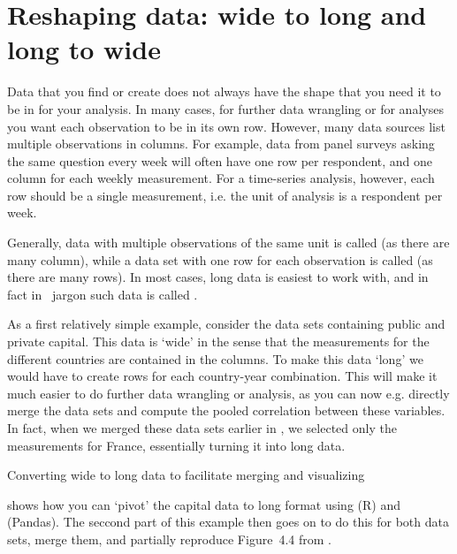 \section{Reshaping data: wide to long and long to wide}\label{sec:pivot}

Data that you find or create does not always have the shape that you need it to be in for your analysis.
In many cases, for further data wrangling or for analyses you want each observation to be in its own row.
However, many data sources list multiple observations in columns.
For example, data from panel surveys asking the same question every week will often have one row per respondent,
and one column for each weekly measurement.
For a time-series analysis, however, each row should be a single measurement,
i.e. the unit of analysis is a respondent per week.

Generally, data with multiple observations of the same unit is called  (as there are many column),
while a data set with one row for each observation is called  (as there are many rows).
In most cases, long data is easiest to work with, and in fact in \tidyverse\ jargon such data is called .

As a first relatively simple example, consider the data sets containing public and private capital.
This data is `wide' in the sense that the measurements for the different countries are contained in the columns.
To make this data `long' we would have to create rows for each country-year combination.
This will make it much easier to do further data wrangling or analysis, as you can now e.g. directly merge the data sets and compute the pooled correlation between these variables. 
In fact, when we merged these data sets earlier in , we selected only the measurements for France, essentially turning it into long data.

\begin{ccsexample}
  \caption{Converting wide to long data to facilitate merging and visualizing}\label{ex:merge}
\end{ccsexample}

 shows how you can `pivot' the capital data to long format using  (R) and  (Pandas). The seccond part of this example then goes on to do this for both data sets, merge them, and partially reproduce Figure~4.4 from \citet{piketty}.

